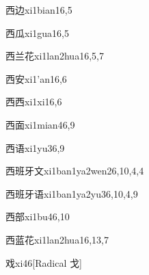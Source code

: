 \begin{verbete}{西边}{xi1bian1}{6,5}
\end{verbete}

\begin{verbete}{西瓜}{xi1gua1}{6,5}
\end{verbete}

\begin{verbete}{西兰花}{xi1lan2hua1}{6,5,7}
\end{verbete}

\begin{verbete}{西安}{xi1'an1}{6,6}
\end{verbete}

\begin{verbete}{西西}{xi1xi1}{6,6}
\end{verbete}

\begin{verbete}{西面}{xi1mian4}{6,9}
\end{verbete}

\begin{verbete}{西语}{xi1yu3}{6,9}
\end{verbete}

\begin{verbete}{西班牙文}{xi1ban1ya2wen2}{6,10,4,4}
\end{verbete}

\begin{verbete}{西班牙语}{xi1ban1ya2yu3}{6,10,4,9}
\end{verbete}

\begin{verbete}{西部}{xi1bu4}{6,10}
\end{verbete}

\begin{verbete}{西蓝花}{xi1lan2hua1}{6,13,7}
\end{verbete}

\begin{verbete}{戏}{xi4}{6}[Radical 戈]
\end{verbete}

